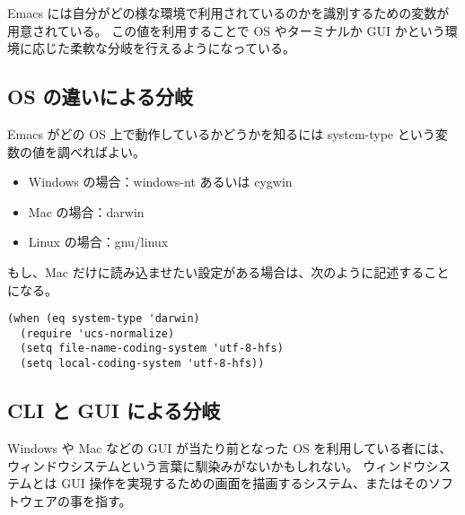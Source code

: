 Emacs には自分がどの様な環境で利用されているのかを識別するための変数が用意されている。
この値を利用することで OS やターミナルか GUI かという環境に応じた柔軟な分岐を行えるようになっている。
\subsection{OS の違いによる分岐}
Emacs がどの OS 上で動作しているかどうかを知るには system-type という変数の値を調べればよい。
\begin{itemize}\setlength{\leftskip}{-1.00zw}%
\item Windows の場合：windows-nt あるいは cygwin
\item Mac の場合：darwin
\item Linux の場合：gnu/linux
\end{itemize}
もし、Mac だけに読み込ませたい設定がある場合は、次のように記述することになる。
\begin{mdframed}[roundcorner=0.50zw,leftmargin=3.00zw,rightmargin=3.00zw,skipabove=0.40zw,skipbelow=0.40zw,innertopmargin=4.00pt,innerbottommargin=4.00pt,innerleftmargin=5.00pt,innerrightmargin=5.00pt,linecolor=gray!020,linewidth=0.50pt,backgroundcolor=gray!20]
\begin{verbatim}
(when (eq system-type 'darwin)
  (require 'ucs-normalize)
  (setq file-name-coding-system 'utf-8-hfs)
  (setq local-coding-system 'utf-8-hfs))
\end{verbatim}
\end{mdframed}
\subsection{CLI と GUI による分岐}
Windows や Mac などの GUI が当たり前となった OS を利用している者には、ウィンドウシステムという言葉に馴染みがないかもしれない。
ウィンドウシステムとは GUI 操作を実現するための画面を描画するシステム、またはそのソフトウェアの事を指す。\\

